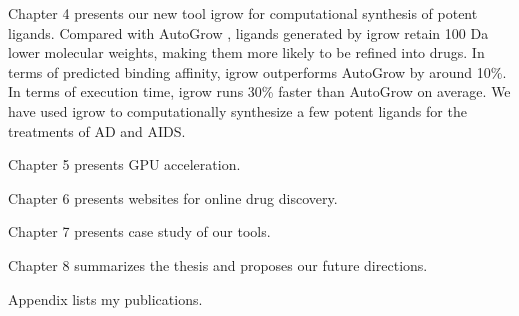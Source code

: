 Chapter 4 presents our new tool igrow for computational synthesis of potent ligands. Compared with AutoGrow \citep{466}, ligands generated by igrow retain 100 Da lower molecular weights, making them more likely to be refined into drugs. In terms of predicted binding affinity, igrow outperforms AutoGrow by around 10\%. In terms of execution time, igrow runs 30\% faster than AutoGrow on average. We have used igrow to computationally synthesize a few potent ligands for the treatments of AD and AIDS.

Chapter 5 presents GPU acceleration.

Chapter 6 presents websites for online drug discovery.

Chapter 7 presents case study of our tools.

Chapter 8 summarizes the thesis and proposes our future directions.

Appendix lists my publications.

\chapterend
